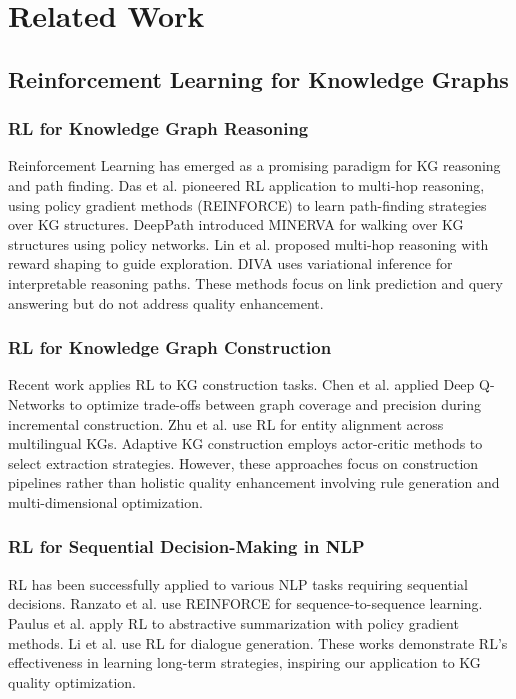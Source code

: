 \documentclass[runningheads]{llncs}
\begin{document}
\section{Related Work}
\label{sec:related_work}

\subsection{Reinforcement Learning for Knowledge Graphs}

\subsubsection{RL for Knowledge Graph Reasoning}
Reinforcement Learning has emerged as a promising paradigm for KG reasoning and path finding. Das et al. \cite{ref_das2018} pioneered RL application to multi-hop reasoning, using policy gradient methods (REINFORCE) to learn path-finding strategies over KG structures. DeepPath \cite{ref_xiong2017} introduced MINERVA for walking over KG structures using policy networks. Lin et al. \cite{ref_lin2018} proposed multi-hop reasoning with reward shaping to guide exploration. DIVA \cite{ref_chen2021} uses variational inference for interpretable reasoning paths. These methods focus on link prediction and query answering but do not address quality enhancement.

\subsubsection{RL for Knowledge Graph Construction}
Recent work applies RL to KG construction tasks. Chen et al. \cite{ref_chen2020} applied Deep Q-Networks to optimize trade-offs between graph coverage and precision during incremental construction. Zhu et al. \cite{ref_zhu2022} use RL for entity alignment across multilingual KGs. Adaptive KG construction \cite{ref_zhang2021} employs actor-critic methods to select extraction strategies. However, these approaches focus on construction pipelines rather than holistic quality enhancement involving rule generation and multi-dimensional optimization.

\subsubsection{RL for Sequential Decision-Making in NLP}
RL has been successfully applied to various NLP tasks requiring sequential decisions. Ranzato et al. \cite{ref_ranzato2016} use REINFORCE for sequence-to-sequence learning. Paulus et al. \cite{ref_paulus2018} apply RL to abstractive summarization with policy gradient methods. Li et al. \cite{ref_li2016} use RL for dialogue generation. These works demonstrate RL's effectiveness in learning long-term strategies, inspiring our application to KG quality optimization.
\end{document}
